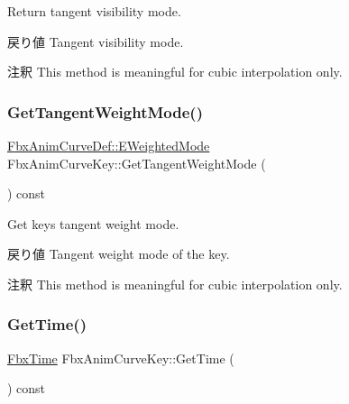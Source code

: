 Return tangent visibility mode. \begin{DoxyReturn}{戻り値}
Tangent visibility mode. 
\end{DoxyReturn}
\begin{DoxyRemark}{注釈}
This method is meaningful for cubic interpolation only. 
\end{DoxyRemark}
\mbox{\label{class_fbx_anim_curve_key_a6971443814d64229442becc934315c56}} 
\subsubsection{\texorpdfstring{Get\+Tangent\+Weight\+Mode()}{GetTangentWeightMode()}}
{\footnotesize\ttfamily \hyperlink{class_fbx_anim_curve_def_aeee6e9cc12501e10dbd3e5caaf66990e}{Fbx\+Anim\+Curve\+Def\+::\+E\+Weighted\+Mode} Fbx\+Anim\+Curve\+Key\+::\+Get\+Tangent\+Weight\+Mode (\begin{DoxyParamCaption}{ }\end{DoxyParamCaption}) const}

Get key\textquotesingle{}s tangent weight mode. \begin{DoxyReturn}{戻り値}
Tangent weight mode of the key. 
\end{DoxyReturn}
\begin{DoxyRemark}{注釈}
This method is meaningful for cubic interpolation only. 
\end{DoxyRemark}
\mbox{\label{class_fbx_anim_curve_key_aae0882b53b31502cb30ea35de028837f}} 
\subsubsection{\texorpdfstring{Get\+Time()}{GetTime()}}
{\footnotesize\ttfamily \hyperlink{class_fbx_time}{Fbx\+Time} Fbx\+Anim\+Curve\+Key\+::\+Get\+Time (\begin{DoxyParamCaption}{ }\end{DoxyParamCaption}) const\hspace{0.3cm}{\ttfamily [virtual]}}

